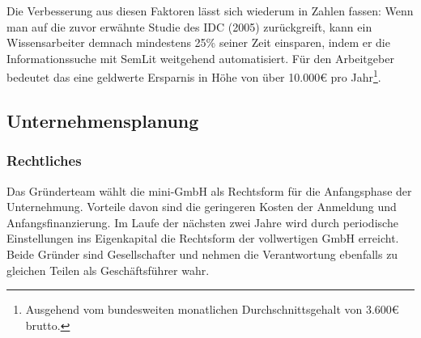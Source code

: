 Die Verbesserung aus diesen Faktoren lässt sich wiederum in Zahlen fassen: Wenn man auf die zuvor erwähnte Studie des IDC (2005) zurückgreift, kann ein Wissensarbeiter demnach mindestens 25\% seiner Zeit einsparen, indem er die Informationssuche mit SemLit weitgehend automatisiert. Für den Arbeitgeber bedeutet das eine geldwerte Ersparnis in Höhe von über 10.000\euro{}  pro Jahr\footnote[4]{Ausgehend vom bundesweiten monatlichen Durchschnittsgehalt von 3.600\euro{}  brutto.}. 



\subsection{Unternehmensplanung}

\subsubsection{Rechtliches}
Das Gründerteam wählt die mini-GmbH als Rechtsform für die Anfangsphase der Unternehmung. Vorteile davon sind die geringeren Kosten der Anmeldung und Anfangsfinanzierung. Im Laufe der nächsten zwei Jahre wird durch periodische Einstellungen ins Eigenkapital die Rechtsform der vollwertigen GmbH erreicht. 
\\
Beide Gründer sind Gesellschafter und nehmen die Verantwortung ebenfalls zu gleichen Teilen als Geschäftsführer wahr.


